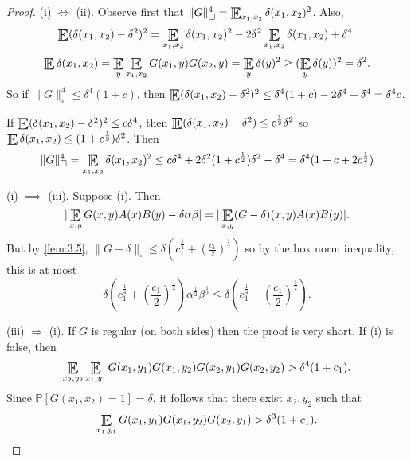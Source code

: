 \documentclass{article}
\DeclareMathOperator*{\E}{\scalerel*{\mathbb{E}}{\textstyle\sum}}
\newcommand{\1}[1]{\mathbbm{1}_{#1}}
\begin{document}
\begin{proof}
  (i) $\iff$ (ii). Observe first that $\|G\|_\square^4 = \E_{x_1,x_2} \delta(x_1, x_2)^2$.
    Also,
    \begin{equation*}
      \E(\delta(x_1,x_2) - \delta^2)^2 = \E_{x_1,x_2} \delta(x_1,x_2)^2 - 2\delta^2 \E_{x_1,x_2} \delta(x_1, x_2) + \delta^4.
    \end{equation*}
    \begin{align*}
      \E \delta(x_1,x_2) = \E_y \E_{x_1,x_2} G(x_1,y) G(x_2,y) = \E_y \delta(y)^2 \geq (\E_y \delta(y))^2 = \delta^2.
    \end{align*}
    So if $\|G\|^4_\square \leq \delta^4 (1+c)$, then $\E(\delta(x_1,x_2) - \delta^2)^2 \leq \delta^4 (1+c) - 2\delta^4 + \delta^4 = \delta^4 c$.

    If $\E(\delta(x_1,x_2) - \delta^2)^2 \leq c \delta^4$, then $\E(\delta(x_1,x_2) - \delta^2) \leq c^\frac{1}{2} \delta^2$ so $\E\delta(x_1,x_2) \leq (1+c^\frac{1}{2}) \delta^2$.
    Then
    \begin{equation*}
      \|G\|_\square^4 = \E_{x_1,x_2} \delta(x_1,x_2)^2 \leq c \delta^4 + 2 \delta^2 (1 + c^\frac{1}{2}) \delta^2 - \delta^4 = \delta^4(1 + c + 2c^{\frac{1}{2}})
    \end{equation*}

    (i) $\implies$ (iii). Suppose (i).
    Then
    \begin{equation*}
      |\E_{x,y} G(x,y) A(x) B(y) - \delta \alpha \beta| = |\E_{x,y} (G-\delta)(x,y) A(x) B(y)|.
    \end{equation*}
    But by \cref{lem:3.5}, $\|G-\delta\|_\square \leq \delta (c_1^\frac{1}{4} + (\frac{c_1}{2})^\frac{1}{2})$
    so by the box norm inequality, this is at most
    \begin{equation*}
      \delta\left(c_1^\frac{1}{4} + \left(\frac{c_1}{2}\right)^\frac{1}{2}\right) \alpha^\frac{1}{2} \beta^\frac{1}{2} \leq \delta\left(c_1^\frac{1}{4} + \left(\frac{c_1}{2}\right)^\frac{1}{2}\right).
    \end{equation*}

    (iii) $\Rightarrow$ (i). If $G$ is regular (on both sides) then the proof is very short.
    If (i) is false, then
    \begin{equation*}
      \E_{x_2,y_2} \E_{x_1,y_1} G(x_1, y_1) G(x_1, y_2) G(x_2, y_1) G(x_2, y_2) > \delta^4(1+c_1).
    \end{equation*}
    Since $\mathbb{P}[G(x_1,x_2)=1]=\delta$, it follows that there exist $x_2, y_2$ such that
    \begin{equation*}
      \E_{x_1,y_1} G(x_1, y_1) G(x_1, y_2) G(x_2, y_1) > \delta^3 (1 + c_1).
    \end{equation*}


\end{proof}
\end{document}

